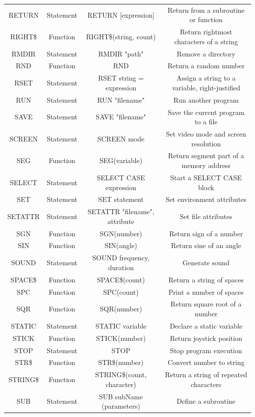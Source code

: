 \documentclass[10pt, reqno]{exam}
\begin{document}
{\begin{longtable}{|c|c|c|c|}
    RETURN & Statement & RETURN [expression] & Return from a subroutine or function \\
    RIGHT\$ & Function & RIGHT\$(string, count) & Return rightmost characters of a string \\
    RMDIR & Statement & RMDIR "path" & Remove a directory \\
    RND & Function & RND & Return a random number \\
    RSET & Statement & RSET string = expression & Assign a string to a variable, right-justified \\
    RUN & Statement & RUN "filename" & Run another program \\
    SAVE & Statement & SAVE "filename" & Save the current program to a file \\
    SCREEN & Statement & SCREEN mode & Set video mode and screen resolution \\
    SEG & Function & SEG(variable) & Return segment part of a memory address \\
    SELECT & Statement & SELECT CASE expression & Start a SELECT CASE block \\
    SET & Statement & SET statement & Set environment attributes \\
    SETATTR & Statement & SETATTR "filename", attribute & Set file attributes \\
    SGN & Function & SGN(number) & Return sign of a number \\
    SIN & Function & SIN(angle) & Return sine of an angle \\
    SOUND & Statement & SOUND frequency, duration & Generate sound \\
    SPACE\$ & Function & SPACE\$(count) & Return a string of spaces \\
    SPC & Function & SPC(count) & Print a number of spaces \\
    SQR & Function & SQR(number) & Return square root of a number \\
    STATIC & Statement & STATIC variable & Declare a static variable \\
    STICK & Function & STICK(number) & Return joystick position \\
    STOP & Statement & STOP & Stop program execution \\
    STR\$ & Function & STR\$(number) & Convert number to string \\
    STRING\$ & Function & STRING\$(count, character) & Return a string of repeated characters \\
    SUB & Statement & SUB subName (parameters) & Define a subroutine \\

\end{longtable}}
\end{document}
